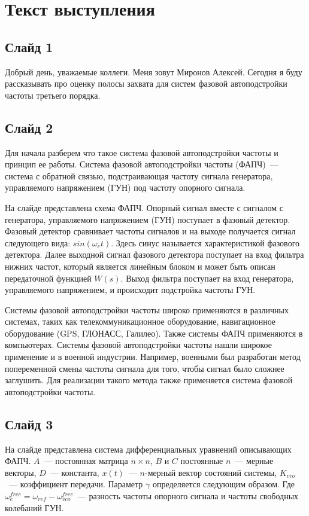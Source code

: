 \documentclass[a4paper,article,14pt]{extarticle}
\begin{document}
\section*{Текст выступления}
\subsection*{Слайд 1}
  Добрый день, уважаемые коллеги. Меня зовут Миронов Алексей. Сегодня я буду рассказывать про оценку полосы захвата для систем фазовой автоподстройки частоты третьего порядка. 

\subsection*{Слайд 2}
  Для начала разберем что такое система фазовой автоподстройки частоты и принцип ее работы. Система фазовой автоподстройки частоты (ФАПЧ)~--- система с обратной связью, подстраивающая частоту сигнала генератора, управляемого напряжением (ГУН) под частоту опорного сигнала.
  
На слайде представлена схема ФАПЧ. Опорный сигнал вместе с сигналом с генератора, управляемого напряжением (ГУН) поступает в фазовый детектор. Фазовый детектор сравнивает частоты сигналов и на выходе получается сигнал следующего вида: $sin(\omega_e t)$. Здесь синус называется характеристикой фазового детектора. Далее выходной сигнал фазового детектора поступает на вход фильтра нижних частот, который является линейным блоком и может быть описан передаточной функцией $W(s)$. Выход фильтра поступает на вход генератора, управляемого напряжением, и происходит подстройка частоты ГУН. 
  
  Системы фазовой автоподстройки частоты широко применяются в различных системах, таких как телекоммуникационное оборудование, навигационное оборудование (GPS, ГЛОНАСС, Галилео). Также системы ФАПЧ применяются в компьютерах. Системы фазовой автоподстройки частоты нашли широкое применение и в военной индустрии. Например, военными был разработан метод попеременной смены частоты сигнала для того, чтобы сигнал было сложнее заглушить. Для реализации такого метода также применяется система фазовой автоподстройки частоты.
    
    \subsection*{Слайд 3}
На слайде представлена система дифференциальных уравнений описывающих ФАПЧ. $A$~--- постоянная матрица $n \times n$, $B$ и $C$ постоянные $n$~--- мерные векторы, $D$~--- константа, $x(t)$~--- $n$-мерный вектор состояний системы, $K_{vco}$~--- коэффициент передачи. Параметр $\gamma$ определяется следующим образом. Где $\omega^{free}_{e}=\omega_{ref}-\omega_{vco}^{free}$~--- разность частоты опорного сигнала и частоты свободных колебаний ГУН.
\end{document}
